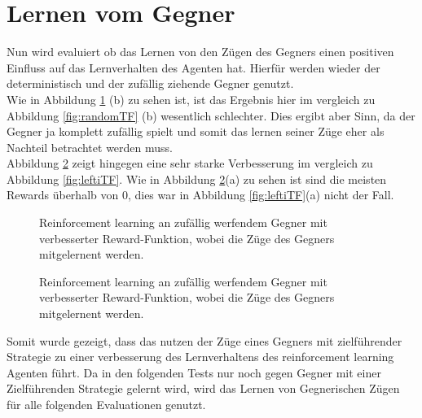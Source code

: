 \section{Lernen vom Gegner}
Nun wird evaluiert ob das Lernen von den Zügen des Gegners einen positiven Einfluss auf das Lernverhalten des Agenten hat. Hierfür werden wieder der deterministisch und der zufällig ziehende Gegner genutzt.\\
Wie in Abbildung \ref{fig:randomTT} (b) zu sehen ist, ist das Ergebnis hier im vergleich zu Abbildung \ref{fig:randomTF} (b) wesentlich schlechter. Dies ergibt aber Sinn, da der Gegner ja komplett zufällig spielt und somit das lernen seiner Züge eher als Nachteil betrachtet werden muss.\\
Abbildung \ref{fig:leftiTT} zeigt hingegen eine sehr starke Verbesserung im vergleich zu Abbildung \ref{fig:leftiTF}. Wie in Abbildung \ref{fig:leftiTT}(a) zu sehen ist sind die meisten Rewards überhalb von 0, dies war in Abbildung \ref{fig:leftiTF}(a) nicht der Fall.


\begin{figure}%
    \centering
    \qquad
    \caption{Reinforcement learning an zufällig werfendem Gegner mit verbesserter Reward-Funktion, wobei die Züge des Gegners mitgelernent werden.}%
    \label{fig:randomTT}%
\end{figure}

\begin{figure}%
    \centering
    \qquad
    \caption{Reinforcement learning an zufällig werfendem Gegner mit verbesserter Reward-Funktion, wobei die Züge des Gegners mitgelernent werden.}%
    \label{fig:leftiTT}%
\end{figure}

Somit wurde gezeigt, dass das nutzen der Züge eines Gegners mit zielführender Strategie zu einer verbesserung des Lernverhaltens des reinforcement learning Agenten führt.
Da in den folgenden Tests nur noch gegen Gegner mit einer Zielführenden Strategie gelernt wird, wird das Lernen von Gegnerischen Zügen für alle folgenden Evaluationen genutzt.

